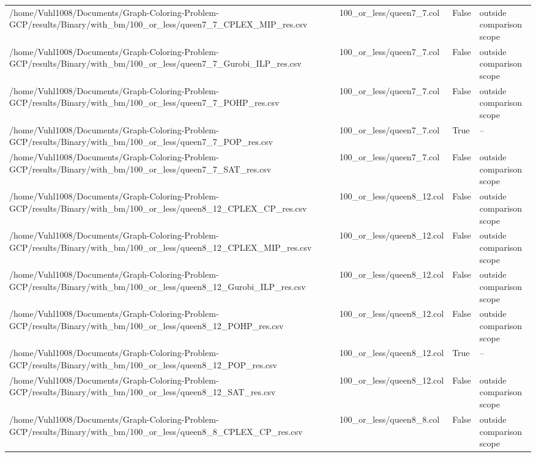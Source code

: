 \begin{table}[htbp]
\begin{tabular}{llll}
/home/Vuhl1008/Documents/Graph-Coloring-Problem-GCP/results/Binary/with\_bm/100\_or\_less/queen7\_7\_CPLEX\_MIP\_res.csv & 100\_or\_less/queen7\_7.col & False & outside comparison scope \\
/home/Vuhl1008/Documents/Graph-Coloring-Problem-GCP/results/Binary/with\_bm/100\_or\_less/queen7\_7\_Gurobi\_ILP\_res.csv & 100\_or\_less/queen7\_7.col & False & outside comparison scope \\
/home/Vuhl1008/Documents/Graph-Coloring-Problem-GCP/results/Binary/with\_bm/100\_or\_less/queen7\_7\_POHP\_res.csv & 100\_or\_less/queen7\_7.col & False & outside comparison scope \\
/home/Vuhl1008/Documents/Graph-Coloring-Problem-GCP/results/Binary/with\_bm/100\_or\_less/queen7\_7\_POP\_res.csv & 100\_or\_less/queen7\_7.col & True & -- \\
/home/Vuhl1008/Documents/Graph-Coloring-Problem-GCP/results/Binary/with\_bm/100\_or\_less/queen7\_7\_SAT\_res.csv & 100\_or\_less/queen7\_7.col & False & outside comparison scope \\
/home/Vuhl1008/Documents/Graph-Coloring-Problem-GCP/results/Binary/with\_bm/100\_or\_less/queen8\_12\_CPLEX\_CP\_res.csv & 100\_or\_less/queen8\_12.col & False & outside comparison scope \\
/home/Vuhl1008/Documents/Graph-Coloring-Problem-GCP/results/Binary/with\_bm/100\_or\_less/queen8\_12\_CPLEX\_MIP\_res.csv & 100\_or\_less/queen8\_12.col & False & outside comparison scope \\
/home/Vuhl1008/Documents/Graph-Coloring-Problem-GCP/results/Binary/with\_bm/100\_or\_less/queen8\_12\_Gurobi\_ILP\_res.csv & 100\_or\_less/queen8\_12.col & False & outside comparison scope \\
/home/Vuhl1008/Documents/Graph-Coloring-Problem-GCP/results/Binary/with\_bm/100\_or\_less/queen8\_12\_POHP\_res.csv & 100\_or\_less/queen8\_12.col & False & outside comparison scope \\
/home/Vuhl1008/Documents/Graph-Coloring-Problem-GCP/results/Binary/with\_bm/100\_or\_less/queen8\_12\_POP\_res.csv & 100\_or\_less/queen8\_12.col & True & -- \\
/home/Vuhl1008/Documents/Graph-Coloring-Problem-GCP/results/Binary/with\_bm/100\_or\_less/queen8\_12\_SAT\_res.csv & 100\_or\_less/queen8\_12.col & False & outside comparison scope \\
/home/Vuhl1008/Documents/Graph-Coloring-Problem-GCP/results/Binary/with\_bm/100\_or\_less/queen8\_8\_CPLEX\_CP\_res.csv & 100\_or\_less/queen8\_8.col & False & outside comparison scope \\

\end{tabular}
\end{table}
